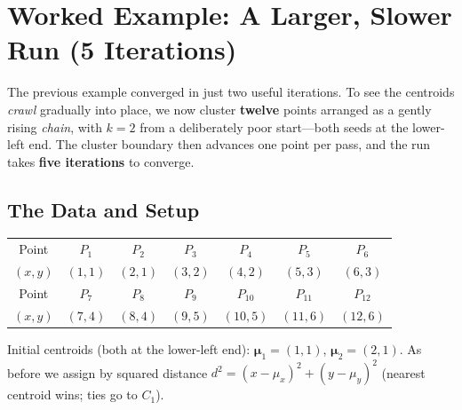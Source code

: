 \documentclass[11pt,a4paper]{report}
\theoremstyle{definition}
\theoremstyle{plain}
\theoremstyle{remark}
\newcommand{\vmu}{\bm{\mu}}
\begin{document}
	\chapter{Worked Example: A Larger, Slower Run (5 Iterations)}
	\label{ch:worked2}
	
	The previous example converged in just two useful iterations. To see the
	centroids \emph{crawl} gradually into place, we now cluster \textbf{twelve}
	points arranged as a gently rising \emph{chain}, with $k=2$ from a deliberately
	poor start---both seeds at the lower-left end. The cluster boundary then
	advances one point per pass, and the run takes \textbf{five iterations} to
	converge.
	
	\section{The Data and Setup}
	\begin{center}
	\begin{tabular}{@{}c|cccccc@{}}
	\toprule
	Point & $P_1$ & $P_2$ & $P_3$ & $P_4$ & $P_5$ & $P_6$\\
	$(x,y)$ & $(1,1)$ & $(2,1)$ & $(3,2)$ & $(4,2)$ & $(5,3)$ & $(6,3)$\\
	\midrule
	Point & $P_7$ & $P_8$ & $P_9$ & $P_{10}$ & $P_{11}$ & $P_{12}$\\
	$(x,y)$ & $(7,4)$ & $(8,4)$ & $(9,5)$ & $(10,5)$ & $(11,6)$ & $(12,6)$\\
	\bottomrule
	\end{tabular}
	\end{center}
	Initial centroids (both at the lower-left end):
	$\vmu_1=(1,1)$, $\vmu_2=(2,1)$. As before we assign by squared distance
	$d^2=(x-\mu_x)^2+(y-\mu_y)^2$ (nearest centroid wins; ties go to $C_1$).
	
\end{document}
